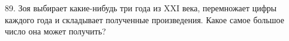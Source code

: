89. Зоя выбирает какие-нибудь три года из XXI века, перемножает цифры каждого года и складывает полученные произведения. Какое самое большое число она может получить?\\
